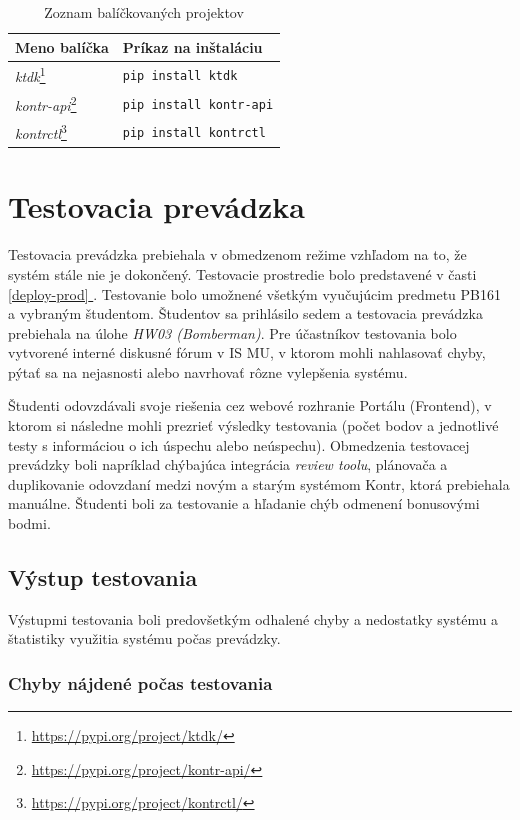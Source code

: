 \documentclass[
  digital, %
  oneside, %
  table,   %
  lof,     %
  lot,   %
]{fithesis3}
\newcommand*{\fullref}[1]{\hyperref[{#1}]{\ref*{#1} \nameref*{#1}}}
\newcommand*{\footurl}[1]{\footnote{\url{#1}}}
\begin{document}
\begin{table}[h]
\begin{tabular}{l l}
Meno balíčka & Príkaz na inštaláciu  \\ [0.5ex] 
\hline
\emph{ktdk}\footurl{https://pypi.org/project/ktdk/} & \texttt{pip install ktdk}  \\
\emph{kontr-api}\footurl{https://pypi.org/project/kontr-api/} & \texttt{pip install kontr-api}  \\
\emph{kontrctl}\footurl{https://pypi.org/project/kontrctl/} &  \texttt{pip install kontrctl} \\
\end{tabular}
\caption{Zoznam balíčkovaných projektov} \label{tab:packages}
\end{table}


\chapter{Testovacia prevádzka}

Testovacia prevádzka prebiehala v obmedzenom režime vzhľadom na to, že systém stále nie je dokončený. Testovacie prostredie bolo predstavené v časti \fullref{deploy-prod}. Testovanie bolo umožnené všetkým vyučujúcim predmetu PB161 a vybraným študentom. Študentov sa prihlásilo sedem a testovacia prevádzka prebiehala na úlohe \emph{HW03 (Bomberman)}. Pre účastníkov testovania bolo vytvorené interné diskusné fórum v IS MU, v ktorom mohli nahlasovať chyby, pýtať sa na nejasnosti alebo navrhovať rôzne vylepšenia systému.

Študenti odovzdávali svoje riešenia cez webové rozhranie Portálu (Frontend), v ktorom si následne mohli prezrieť výsledky testovania (počet bodov a jednotlivé testy s informáciou o ich úspechu alebo neúspechu). Obmedzenia testovacej prevádzky boli napríklad chýbajúca integrácia \emph{review toolu}, plánovača a duplikovanie odovzdaní medzi novým a starým systémom Kontr, ktorá prebiehala manuálne. Študenti boli za testovanie a hľadanie chýb odmenení bonusovými bodmi.

\section{Výstup testovania}
Výstupmi testovania boli predovšetkým odhalené chyby a nedostatky systému a štatistiky využitia systému počas prevádzky.

\subsection{Chyby nájdené počas testovania}
\end{document}

